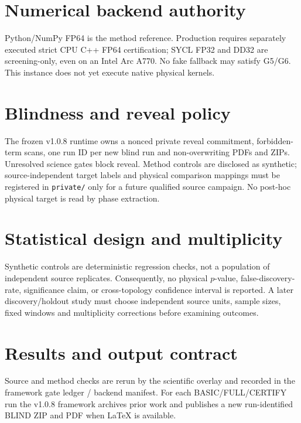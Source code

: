 \documentclass[11pt,a4paper]{article}
\begin{document}
\section{Numerical backend authority}
Python/NumPy FP64 is the method reference. Production requires separately executed strict CPU C++ FP64 certification; SYCL FP32 and DD32 are screening-only, even on an Intel Arc A770. No fake fallback may satisfy G5/G6. This instance does not yet execute native physical kernels.

\section{Blindness and reveal policy}
The frozen v1.0.8 runtime owns a nonced private reveal commitment, forbidden-term scans, one run ID per new blind run and non-overwriting PDFs and ZIPs. Unresolved science gates block reveal. Method controls are disclosed as synthetic; source-independent target labels and physical comparison mappings must be registered in \texttt{private/} only for a future qualified source campaign. No post-hoc physical target is read by phase extraction.

\section{Statistical design and multiplicity}
Synthetic controls are deterministic regression checks, not a population of independent source replicates. Consequently, no physical $p$-value, false-discovery-rate, significance claim, or cross-topology confidence interval is reported. A later discovery/holdout study must choose independent source units, sample sizes, fixed windows and multiplicity corrections before examining outcomes.

\section{Results and output contract}
Source and method checks are rerun by the scientific overlay and recorded in the framework gate ledger / backend manifest. For each BASIC/FULL/CERTIFY run the v1.0.8 framework archives prior work and publishes a new run-identified BLIND ZIP and PDF when LaTeX is available.

\end{document}
